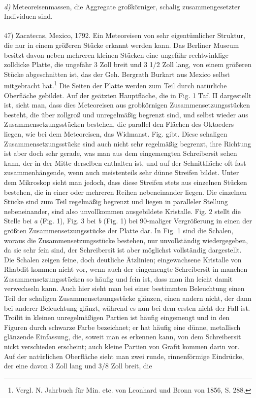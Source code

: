\documentclass[a4paper, 11pt, oneside]{article}
\begin{document}
\paragraph{}
\emph{d)} Meteoreisenmassen, die Aggregate großkörniger, schalig zusammengesetzter Individuen sind.
\vspace{\medskipamount}
\paragraph{}
47) Zacatecas, Mexico, 1792. Ein Meteoreisen von sehr eigentümlicher Struktur, die nur in einem größeren Stücke erkannt werden kann. Das Berliner Museum besitzt davon neben mehreren kleinen Stücken eine ungefähr rechtwinklige zolldicke Platte, die ungefähr 3 Zoll breit und 3 1/2 Zoll lang, von einem größeren Stücke abgeschnitten ist, das der Geh. Bergrath Burkart aus Mexico selbst mitgebracht hat.\footnote{Vergl. N. Jahrbuch für Min. etc. von Leonhard und Bronn von 1856, S. 288.} Die Seiten der Platte werden zum Teil durch natürliche Oberfläche gebildet. Auf der geätzten Hauptfläche, die in Fig. 1 Taf. II dargestellt ist, sieht man, dass dies Meteoreisen aus grobkörnigen Zusammensetzungsstücken besteht, die über zollgroß und unregelmäßig begrenzt sind, und selbst wieder aus Zusammensetzungsstücken bestehen, die parallel den Flächen des Oktaeders liegen, wie bei dem Meteoreisen, das Widmanst. Fig. gibt. Diese schaligen Zusammensetzungsstücke sind auch nicht sehr regelmäßig begrenzt, ihre Richtung ist aber doch sehr gerade, was man aus dem eingemengten Schreibersit sehen kann, der in der Mitte derselben enthalten ist, und auf der Schnittfläche oft fast zusammenhängende, wenn auch meistenteils sehr dünne Streifen bildet. Unter dem Mikroskop sieht man jedoch, dass diese Streifen stets aus einzelnen Stücken bestehen, die in einer oder mehreren Reihen nebeneinander liegen. Die einzelnen Stücke sind zum Teil regelmäßig begrenzt und liegen in paralleler Stellung nebeneinander, sind also unvollkommen ausgebildete Kristalle. Fig. 2 stellt die Stelle bei \emph{a} (Fig. 1), Fig. 3 bei \emph{b} (Fig. 1) bei 90-maliger Vergrößerung in einen der größten Zusammensetzungsstücke der Platte dar. In Fig. 1 sind die Schalen, woraus die Zusammensetzungsstücke bestehen, nur unvollständig wiedergegeben, da sie sehr fein sind, der Schreibersit ist aber möglichst vollständig dargestellt. Die Schalen zeigen feine, doch deutliche Ätzlinien; eingewachsene Kristalle von Rhabdit kommen nicht vor, wenn auch der eingemengte Schreibersit in manchen Zusammensetzungsstücken so häufig und fein ist, dass man ihn leicht damit verwechseln kann. Auch hier sieht man bei einer bestimmten Beleuchtung einen Teil der schaligen Zusammensetzungsstücke glänzen, einen andern nicht, der dann bei anderer Beleuchtung glänzt, während es nun bei dem ersten nicht der Fall ist. Troilit in kleinen unregelmäßigen Partien ist häufig eingemengt und in den Figuren durch schwarze Farbe bezeichnet; er hat häufig eine dünne, metallisch glänzende Einfassung, die, soweit man es erkennen kann, von dem Schreibersit nickt verschieden erscheint; auch kleine Partien von Grafit kommen darin vor. Auf der natürlichen Oberfläche sieht man zwei runde, rinnenförmige Eindrücke, der eine davon 3 Zoll lang und 3/8 Zoll breit, die 
\end{document}
